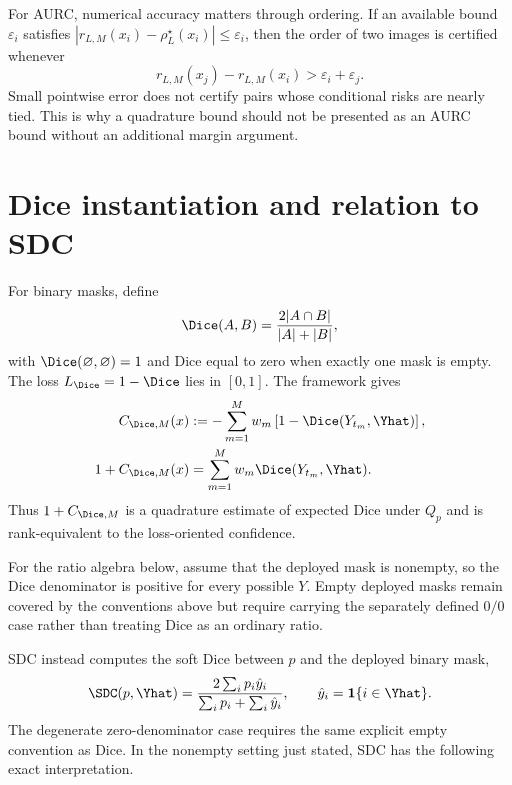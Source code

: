 For AURC, numerical accuracy matters through ordering. If an available bound
$\varepsilon_i$ satisfies
$|r_{L,M}(x_i)-\rho_L^\star(x_i)|\leq\varepsilon_i$, then the order of two images is
certified whenever
\begin{equation}\label{eq:ranking-margin}
  r_{L,M}(x_j)-r_{L,M}(x_i)>\varepsilon_i+\varepsilon_j.
\end{equation}
Small pointwise error does not certify pairs whose conditional risks are nearly tied.
This is why a quadrature bound should not be presented as an AURC bound without an
additional margin argument.

\section{Dice instantiation and relation to SDC}\label{sec:theory}

For binary masks, define
\begin{equation}\label{eq:dice-definition}
  \Dice(A,B)=\frac{2|A\cap B|}{|A|+|B|},
\end{equation}
with $\Dice(\varnothing,\varnothing)=1$ and Dice equal to zero when exactly one mask
is empty. The loss $L_{\Dice}=1-\Dice$ lies in $[0,1]$. The framework gives
\begin{equation}\label{eq:levelset-dice}
\begin{split}
  C_{\Dice,M}(x)
  &:=-\sum_{m=1}^M w_m
      \left[1-\Dice(Y_{t_m},\Yhat)\right],\\
  1+C_{\Dice,M}(x)
  &=\sum_{m=1}^M w_m\Dice(Y_{t_m},\Yhat).
\end{split}
\end{equation}
Thus $1+C_{\Dice,M}$ is a quadrature estimate of expected Dice under $Q_p$ and is
rank-equivalent to the loss-oriented confidence.

For the ratio algebra below, assume that the deployed mask is nonempty, so the Dice
denominator is positive for every possible $Y$. Empty deployed masks remain covered
by the conventions above but require carrying the separately defined $0/0$ case
rather than treating Dice as an ordinary ratio.

SDC instead computes the soft Dice between $p$ and the deployed binary mask,
\begin{equation}\label{eq:sdc}
  \SDC(p,\Yhat)
  =\frac{2\sum_i p_i\hat y_i}
  {\sum_i p_i+\sum_i\hat y_i},
  \qquad
  \hat y_i=\mathbf 1\{i\in\Yhat\}.
\end{equation}
The degenerate zero-denominator case requires the same explicit empty convention as
Dice. In the nonempty setting just stated, SDC has the following exact interpretation.

